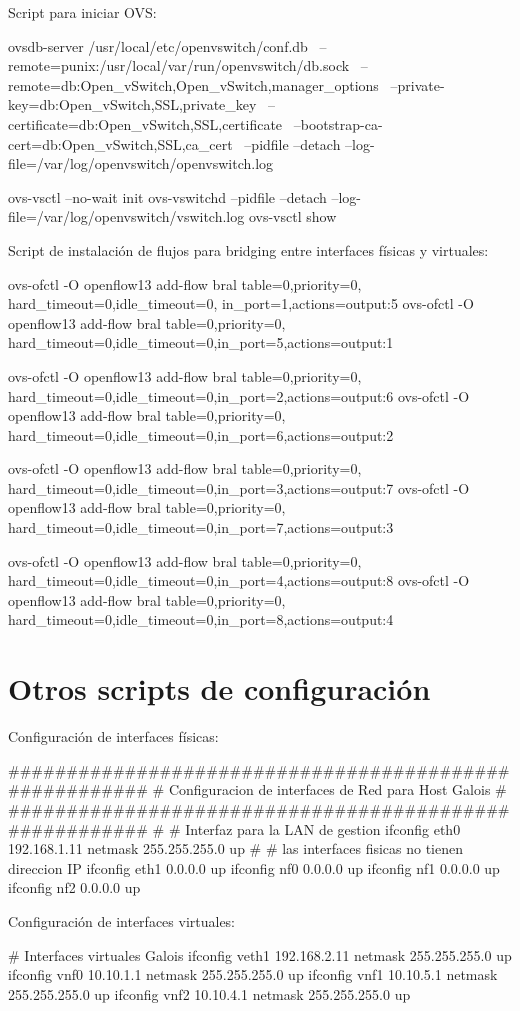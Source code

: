 \newpage
Script para iniciar OVS:
\begin{bash}
ovsdb-server /usr/local/etc/openvswitch/conf.db \
--remote=punix:/usr/local/var/run/openvswitch/db.sock \
--remote=db:Open_vSwitch,Open_vSwitch,manager_options \
--private-key=db:Open_vSwitch,SSL,private_key \
--certificate=db:Open_vSwitch,SSL,certificate \
--bootstrap-ca-cert=db:Open_vSwitch,SSL,ca_cert \
--pidfile --detach 
--log-file=/var/log/openvswitch/openvswitch.log

ovs-vsctl --no-wait init
ovs-vswitchd --pidfile --detach 
--log-file=/var/log/openvswitch/vswitch.log
ovs-vsctl show

\end{bash}
\vspace{1cm}
Script de instalaci\'on de flujos para bridging entre interfaces f\'isicas y virtuales:
\begin{bash}
ovs-ofctl -O openflow13 add-flow bral table=0,priority=0,
hard_timeout=0,idle_timeout=0, in_port=1,actions=output:5
ovs-ofctl -O openflow13 add-flow bral table=0,priority=0,
hard_timeout=0,idle_timeout=0,in_port=5,actions=output:1

ovs-ofctl -O openflow13 add-flow bral table=0,priority=0,
hard_timeout=0,idle_timeout=0,in_port=2,actions=output:6
ovs-ofctl -O openflow13 add-flow bral table=0,priority=0,
hard_timeout=0,idle_timeout=0,in_port=6,actions=output:2

ovs-ofctl -O openflow13 add-flow bral table=0,priority=0,
hard_timeout=0,idle_timeout=0,in_port=3,actions=output:7
ovs-ofctl -O openflow13 add-flow bral table=0,priority=0,
hard_timeout=0,idle_timeout=0,in_port=7,actions=output:3

ovs-ofctl -O openflow13 add-flow bral table=0,priority=0,
hard_timeout=0,idle_timeout=0,in_port=4,actions=output:8
ovs-ofctl -O openflow13 add-flow bral table=0,priority=0,
hard_timeout=0,idle_timeout=0,in_port=8,actions=output:4
\end{bash}

\newpage
\section{Otros scripts de configuraci\'on}

Configuraci\'on de interfaces f\'isicas:
\begin{bash}

#######################################################
# Configuracion de interfaces de Red para Host Galois #
#######################################################
#
# Interfaz para la LAN de gestion
ifconfig eth0 192.168.1.11 netmask 255.255.255.0 up
#
# las interfaces fisicas no tienen direccion IP
ifconfig eth1 0.0.0.0 up
ifconfig nf0 0.0.0.0 up
ifconfig nf1 0.0.0.0 up
ifconfig nf2 0.0.0.0 up

\end{bash}
\vspace{1cm}
Configuraci\'on de interfaces virtuales:
\begin{bash}
# Interfaces virtuales Galois 
ifconfig veth1 192.168.2.11 netmask 255.255.255.0 up
ifconfig vnf0 10.10.1.1 netmask 255.255.255.0 up
ifconfig vnf1 10.10.5.1 netmask 255.255.255.0 up
ifconfig vnf2 10.10.4.1 netmask 255.255.255.0 up
\end{bash}
